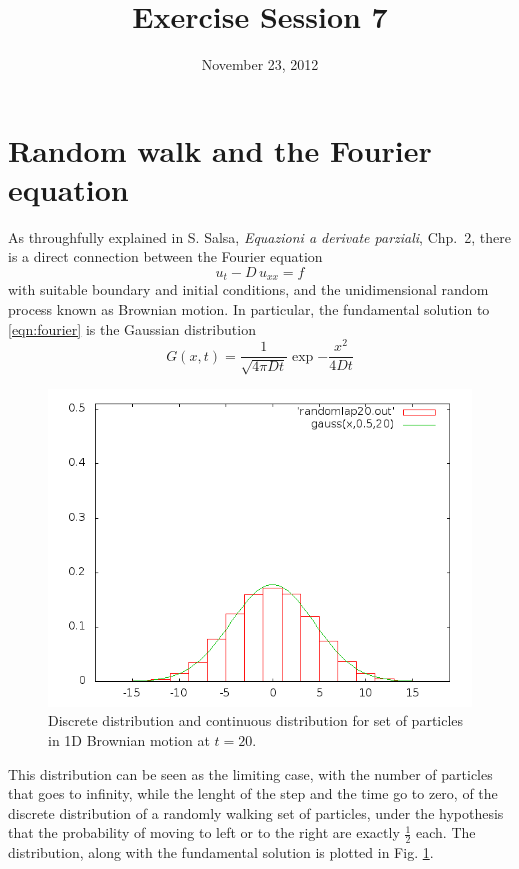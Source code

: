 \documentclass[10pt,a4paper]{article}
\title{Exercise Session 7}
\date{November 23, 2012}
\begin{document}
\lstset{language=[ISO]C++}
\maketitle

\section*{Random walk and the Fourier equation}

As throughfully explained in S. Salsa, \emph{Equazioni a derivate parziali},
Chp.~2, there is a direct connection between the Fourier equation
\begin{equation}
\label{eqn:fourier}
u_t - D \, u_{xx} = f
\end{equation}
with suitable boundary and initial conditions, and the unidimensional random
process known as Brownian motion. In particular, the fundamental solution to
\eqref{eqn:fourier} is the Gaussian distribution
\[
G(x,t) = \frac{1}{\sqrt{ 4 \pi D t}} \exp{-\frac{x^2}{4 D t}}
\]
%
\begin{figure}
\centering
\includegraphics[width=.6\textwidth]{fig/randomlap20}
\caption{Discrete distribution and continuous distribution for set of particles
         in 1D Brownian motion at $t = 20$.}
\label{fig:distr}
\end{figure}
%
This distribution can be seen as the limiting case, with the number of particles
that goes to infinity, while the lenght of the step and the time go to zero, of
the discrete distribution of a randomly walking set of particles, under the
hypothesis that the probability of moving to left or to the right are exactly
$\frac{1}{2}$ each. The distribution, along with the fundamental solution is
plotted in Fig. \ref{fig:distr}.




%
\end{document}
